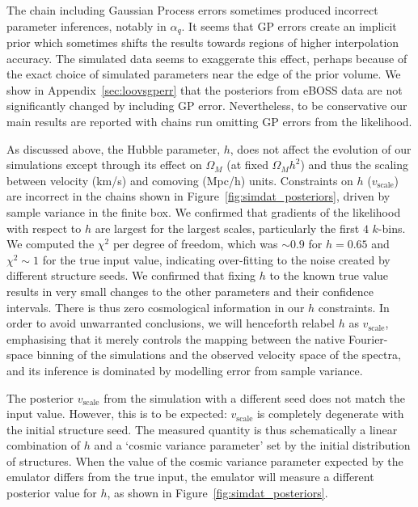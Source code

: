The chain including Gaussian Process errors sometimes produced incorrect parameter inferences, notably in $\alpha_q$.
It seems that GP errors create an implicit prior which sometimes shifts the results towards regions of higher interpolation accuracy.
The simulated data seems to exaggerate this effect, perhaps because of the exact choice of simulated parameters near the edge of the prior volume.
We show in Appendix~\ref{sec:loovsgperr} that the posteriors from eBOSS data are not significantly changed by including GP error.
Nevertheless, to be conservative our main results are reported with chains run omitting GP errors from the likelihood.

As discussed above, the Hubble parameter, $h$, does not affect the evolution of our simulations except through its effect on $\Omega_M$ (at fixed $\Omega_M h^2$) and thus the scaling between velocity (km/s) and comoving (Mpc/h) units.
Constraints on $h$ ($v_\mathrm{scale}$) are incorrect in the chains shown in Figure~\ref{fig:simdat_posteriors}, driven by sample variance in the finite box.
We confirmed that gradients of the likelihood with respect to $h$ are largest for the largest scales, particularly the first $4$ $k$-bins.
We computed the $\chi^2$ per degree of freedom, which was $\sim 0.9$ for $h = 0.65$ and $\chi^2 \sim 1$ for the true input value, indicating over-fitting to the noise created by different structure seeds.
We confirmed that fixing $h$ to the known true value results in very small changes to the other parameters and their confidence intervals.
There is thus zero cosmological information in our $h$ constraints.
In order to avoid unwarranted conclusions, we will henceforth relabel $h$ as $v_\mathrm{scale}$, emphasising that it merely controls the mapping between the native Fourier-space binning of the simulations and the observed velocity space of the spectra, and its inference is dominated by modelling error from sample variance. 

The posterior $v_\mathrm{scale}$ from the simulation with a different seed does not match the input value. However, this is to be expected: $v_\mathrm{scale}$ is completely degenerate with the initial structure seed. The measured quantity is thus schematically a linear combination of $h$ and a `cosmic variance parameter' set by the initial distribution of structures. When the value of the cosmic variance parameter expected by the emulator differs from the true input, the emulator will measure a different posterior value for $h$, as shown in Figure~\ref{fig:simdat_posteriors}.